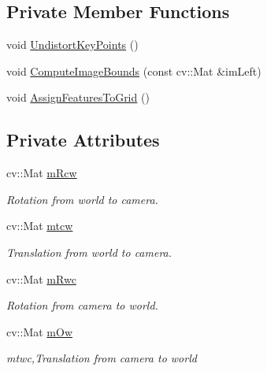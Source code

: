 \subsection*{Private Member Functions}
\begin{DoxyCompactItemize}
\item 
void \mbox{\hyperlink{class_o_r_b___s_l_a_m2_1_1_frame_a2a97fc690d8c1cd5e975d19440a31657}{Undistort\+Key\+Points}} ()
\item 
void \mbox{\hyperlink{class_o_r_b___s_l_a_m2_1_1_frame_a420f0369833f856df1973410ea39b335}{Compute\+Image\+Bounds}} (const cv\+::\+Mat \&im\+Left)
\item 
void \mbox{\hyperlink{class_o_r_b___s_l_a_m2_1_1_frame_aa3ba21cd44638b322db024cba2b9c19e}{Assign\+Features\+To\+Grid}} ()
\end{DoxyCompactItemize}
\subsection*{Private Attributes}
\begin{DoxyCompactItemize}
\item 
cv\+::\+Mat \mbox{\hyperlink{class_o_r_b___s_l_a_m2_1_1_frame_a3923c4b0fc83ab5fdba34ddd823621c6}{m\+Rcw}}
\begin{DoxyCompactList}\small\item\em Rotation from world to camera. \end{DoxyCompactList}\item 
cv\+::\+Mat \mbox{\hyperlink{class_o_r_b___s_l_a_m2_1_1_frame_a31b2fa3a66f2855ec0c71c9ba34cfa8f}{mtcw}}
\begin{DoxyCompactList}\small\item\em Translation from world to camera. \end{DoxyCompactList}\item 
cv\+::\+Mat \mbox{\hyperlink{class_o_r_b___s_l_a_m2_1_1_frame_afda03a992077579e0ed3c20240eef276}{m\+Rwc}}
\begin{DoxyCompactList}\small\item\em Rotation from camera to world. \end{DoxyCompactList}\item 
cv\+::\+Mat \mbox{\hyperlink{class_o_r_b___s_l_a_m2_1_1_frame_a4315630bb510b424d8b089975135199a}{m\+Ow}}
\begin{DoxyCompactList}\small\item\em mtwc,Translation from camera to world \end{DoxyCompactList}\end{DoxyCompactItemize}


